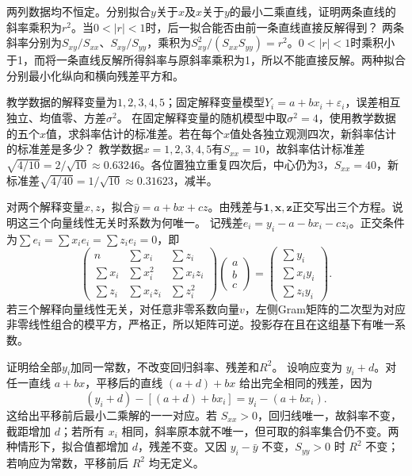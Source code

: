 两列数据均不恒定。分别拟合\(y\)关于\(x\)及\(x\)关于\(y\)的最小二乘直线，证明两条直线的斜率乘积为\(r^2\)。当\(0<|r|<1\)时，后一拟合能否由前一条直线直接反解得到？
\solutionanswer
两条斜率分别为\(S_{xy}/S_{xx}\)、\(S_{xy}/S_{yy}\)，乘积为\(S_{xy}^2/(S_{xx}S_{yy})=r^2\)。\(0<|r|<1\)时乘积小于1，而将一条直线反解所得斜率与原斜率乘积为1，所以不能直接反解。两种拟合分别最小化纵向和横向残差平方和。


教学数据的解释变量为\(1,2,3,4,5\)；固定解释变量模型\(Y_i=a+bx_i+\varepsilon_i\)，误差相互独立、均值零、方差\(\sigma^2\)。
在固定解释变量的随机模型中取\(\sigma^2=4\)，使用教学数据的五个\(x\)值，求斜率估计的标准差。若在每个\(x\)值处各独立观测四次，新斜率估计的标准差是多少？
\solutionanswer
教学数据\(x=1,2,3,4,5\)有\(S_{xx}=10\)，故斜率估计标准差\(\sqrt{4/10}=2/\sqrt{10}\approx0.63246\)。各位置独立重复四次后，中心仍为3，\(S_{xx}=40\)，新标准差\(\sqrt{4/40}=1/\sqrt{10}\approx0.31623\)，减半。


对两个解释变量\(x,z\)，拟合\(\widehat y=a+bx+cz\)。由残差与\(\boldsymbol1,\boldsymbol x,\boldsymbol z\)正交写出三个方程。说明这三个向量线性无关时系数为何唯一。
\solutionanswer
记残差\(e_i=y_i-a-bx_i-cz_i\)。正交条件为\(\sum e_i=\sum x_ie_i=\sum z_ie_i=0\)，即
\[
 \begin{pmatrix}n&\sum x_i&\sum z_i\\\sum x_i&\sum x_i^2&\sum x_iz_i\\\sum z_i&\sum x_iz_i&\sum z_i^2\end{pmatrix}
 \begin{pmatrix}a\\b\\c\end{pmatrix}
 =\begin{pmatrix}\sum y_i\\\sum x_iy_i\\\sum z_iy_i\end{pmatrix}.
\]
若三个解释向量线性无关，对任意非零系数向量\(v\)，左侧Gram矩阵的二次型为对应非零线性组合的模平方，严格正，所以矩阵可逆。投影存在且在这组基下有唯一系数。


证明给全部\(y_i\)加同一常数，不改变回归斜率、残差和\(R^2\)。
\solutionanswer
设响应变为 \(y_i+d\)。对任一直线 \(a+bx\)，平移后的直线 \((a+d)+bx\) 给出完全相同的残差，因为
\[
 (y_i+d)-[(a+d)+bx_i]=y_i-(a+bx_i).
\]
这给出平移前后最小二乘解的一一对应。若 \(S_{xx}>0\)，回归线唯一，故斜率不变，截距增加 \(d\)；若所有 \(x_i\) 相同，斜率原本就不唯一，但可取的斜率集合仍不变。两种情形下，拟合值都增加 \(d\)，残差不变。又因 \(y_i-\bar y\) 不变，\(S_{yy}>0\) 时 \(R^2\) 不变；若响应为常数，平移前后 \(R^2\) 均无定义。


